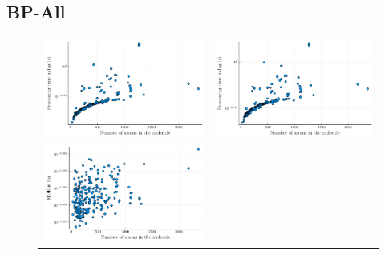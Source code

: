 \documentclass[a4paper,11pt]{article}
\begin{document}
	\subsection{BP-All}
	\begin{figure}[H]
		\begin{tabular}{cc}
			\includegraphics[scale=0.55]{figures/timeMatrixAll.pdf} & 
			\includegraphics[scale=0.55]{figures/timeQuaternionAll.pdf} \\
			\includegraphics[scale=0.55]{figures/MDEMatrixAll.pdf} &

\end{tabular}
\end{figure}
\end{document}
